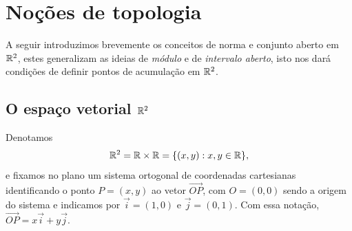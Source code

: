 \chapter{Noções de topologia}

A seguir introduzimos brevemente os conceitos de norma e conjunto aberto em \(\mathbb{R}^2\), estes generalizam as ideias de \textit{módulo} e de \textit{intervalo aberto}, isto nos dará condições de definir pontos de acumulação em \(\mathbb{R}^2\).

\section{O espaço vetorial \texorpdfstring{\(\mathbb{R}^2\)}{R2}}

Denotamos \[\mathbb{R}^2 = \mathbb{R} \times \mathbb{R} = \{(x,y): x,y\in\mathbb{R}\},\] e fixamos no plano um sistema ortogonal de coordenadas cartesianas identificando o ponto \(P = (x,y)\) ao vetor \(\overrightarrow{OP}\), com \(O = (0,0)\) sendo a origem do sistema e indicamos por \(\overrightarrow{i} = (1,0)\) e \(\overrightarrow{j} = (0,1)\). Com essa notação, \(\overrightarrow{OP} = x\overrightarrow{i} + y\overrightarrow{j}\).
